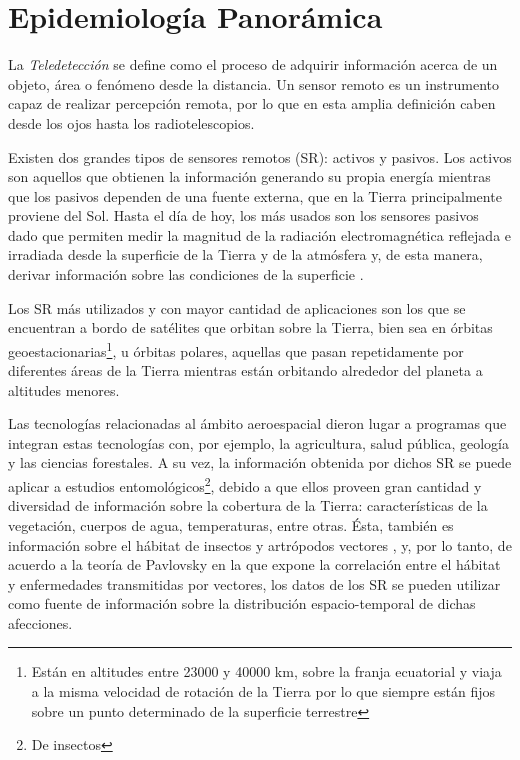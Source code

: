 



\section{Epidemiología Panorámica}

\justifying


\par La \textit{Teledetección} se define como el proceso de adquirir
  información acerca de un objeto, área o fenómeno desde la distancia.
  Un sensor remoto es un instrumento capaz de realizar percepción remota, por lo
  que en esta amplia definición caben desde los ojos hasta los
  radiotelescopios.

\par Existen dos grandes tipos de sensores remotos (SR): activos y pasivos.
  Los activos son aquellos que obtienen la información generando su propia energía
  mientras que los pasivos dependen de una fuente externa, que en la Tierra
  principalmente proviene del Sol. Hasta el día de hoy, los más usados son los
  sensores pasivos dado que permiten medir la magnitud de la radiación electromagnética
  reflejada e irradiada desde la superficie de la Tierra y de la atmósfera y,
  de esta manera, derivar información sobre las condiciones de la superficie \cite{cami_tartagal}.


\par Los SR más utilizados y con mayor cantidad de aplicaciones son los que se
  encuentran a bordo de satélites que orbitan sobre la Tierra, bien sea
  en órbitas geoestacionarias\footnote{Están en altitudes entre 23000 y 40000 km,
  sobre la franja ecuatorial y viaja a la misma velocidad de rotación de la Tierra
  por lo que siempre están fijos sobre un punto determinado de la superficie terrestre},
  u órbitas polares, aquellas que pasan repetidamente por diferentes áreas
  de la Tierra mientras están orbitando alrededor del planeta a altitudes menores.


\par Las tecnologías relacionadas al ámbito aeroespacial dieron lugar a programas
  que integran estas tecnologías con,
  por ejemplo, la agricultura, salud pública, geología y las ciencias forestales.
  A su vez, la información obtenida por dichos SR se puede aplicar a estudios
  entomológicos\footnote{De insectos}, debido a que ellos proveen gran cantidad
  y diversidad de información sobre la cobertura de la Tierra: características
  de la vegetación, cuerpos de agua, temperaturas, entre otras. Ésta, también es
  información sobre el hábitat de insectos y artrópodos vectores \cite{estallo_ndwi, data_driven_prediction},
  y, por lo tanto, de acuerdo a la teoría de Pavlovsky \cite{nidality} en la que
  expone la correlación entre el hábitat y enfermedades transmitidas por vectores,
  los datos de los SR se pueden utilizar como fuente de información sobre la
  distribución espacio-temporal de dichas afecciones.


